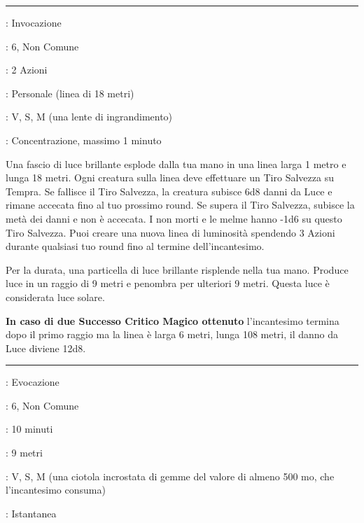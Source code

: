\begin{multicols}{2}
\smallskip\noindent\rule{\linewidth}{2pt} \hypertarget{Bagliore Solare}{}\smallskip{}
\noindent
\begin{description}[noitemsep, topsep=0pt, parsep=0pt, partopsep=0pt, leftmargin=0cm, labelwidth=2.8cm]
	\item[\textbf{Lista di Magia}]: Invocazione
	\item[\textbf{Livello}]: 6, Non Comune
	\item[\textbf{T. di Lancio}]: 2 Azioni
	\item[\textbf{Gittata}]: Personale (linea di 18 metri)
	\item[\textbf{Componenti}]: V, S, M (una lente di ingrandimento)
	\item[\textbf{Durata}]: Concentrazione, massimo 1 minuto
\end{description}

Una fascio di luce brillante esplode dalla tua mano in una linea larga 1 metro e lunga 18 metri. Ogni creatura sulla linea deve effettuare un Tiro Salvezza su Tempra. Se fallisce il Tiro Salvezza, la creatura subisce 6d8 danni da Luce e rimane accecata fino al tuo prossimo round. Se supera il Tiro Salvezza, subisce la metà dei danni e non è accecata. I non morti e le melme hanno -1d6 su questo Tiro Salvezza. Puoi creare una nuova linea di luminosità spendendo 3 Azioni durante qualsiasi tuo round fino al termine dell'incantesimo.

Per la durata, una particella di luce brillante risplende nella tua mano. Produce luce in un raggio di 9 metri e penombra per ulteriori 9 metri. Questa luce è considerata luce solare.

\textbf{In caso di due Successo Critico Magico ottenuto} l'incantesimo termina dopo il primo raggio ma la linea è larga 6 metri, lunga 108 metri, il danno da Luce diviene 12d8.

\smallskip\noindent\rule{\linewidth}{2pt} \hypertarget{Banchetto degli Eroi}{}\smallskip{}
\noindent
\begin{description}[noitemsep, topsep=0pt, parsep=0pt, partopsep=0pt, leftmargin=0cm, labelwidth=2.8cm]
	\item[\textbf{Lista di Magia}]: Evocazione
	\item[\textbf{Livello}]: 6, Non Comune
	\item[\textbf{T. di Lancio}]: 10 minuti
	\item[\textbf{Gittata}]: 9 metri
	\item[\textbf{Componenti}]: V, S, M (una ciotola incrostata di gemme del valore di almeno 500 mo, che l'incantesimo consuma)
	\item[\textbf{Durata}]: Istantanea
\end{description}


\end{multicols}
